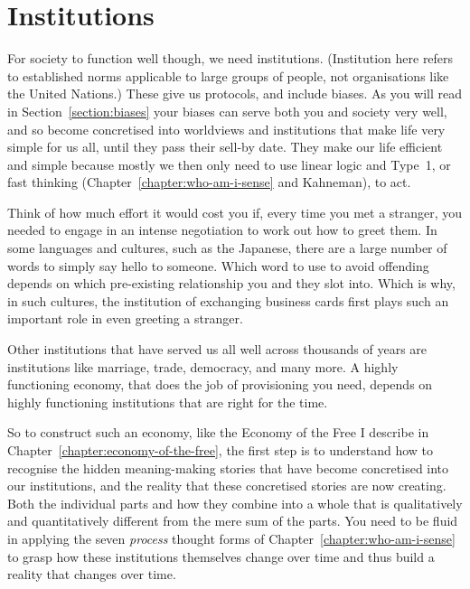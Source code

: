 \section{Institutions}
\label{section:institutions}
For society to function well though, we need institutions. (Institution here refers to established norms applicable to large groups of people, not organisations like the United Nations.) These give us protocols, and include biases. As you will read in Section~\ref{section:biases} your biases can serve both you and society very well, and so become concretised into worldviews and institutions that make life very simple for us all, until they pass their sell-by date. They make our life efficient and simple because mostly we then only need to use linear logic and Type~1, or fast thinking (Chapter~\ref{chapter:who-am-i-sense} and Kahneman\cite{kahneman-thinking}), to act.


Think of how much effort it would cost you if, every time you met a stranger, you needed to engage in an intense negotiation to work out how to greet them. In some languages and cultures, such as the Japanese, there are a large number of words to simply say hello to someone. Which word to use to avoid offending depends on which pre-existing relationship you and they slot into. Which is why, in such cultures, the institution of exchanging business cards first plays such an important role in even greeting a stranger.


Other institutions that have served us all well across thousands of years are institutions like marriage, trade, democracy, and many more. A highly functioning economy, that does the job of provisioning you need, depends on highly functioning institutions that are right for the time.


So to construct such an economy, like the Economy of the Free I describe in Chapter~\ref{chapter:economy-of-the-free}, the first step is to understand how to recognise the hidden meaning\hyp{}making stories that have become concretised into our institutions, and the reality that these concretised stories are now creating. Both the individual parts and how they combine into a whole that is qualitatively and quantitatively different from the mere sum of the parts. You need to be fluid in applying the seven \emph{process} thought forms of Chapter~\ref{chapter:who-am-i-sense} to grasp how these institutions themselves change over time and thus build a reality that changes over time. 



